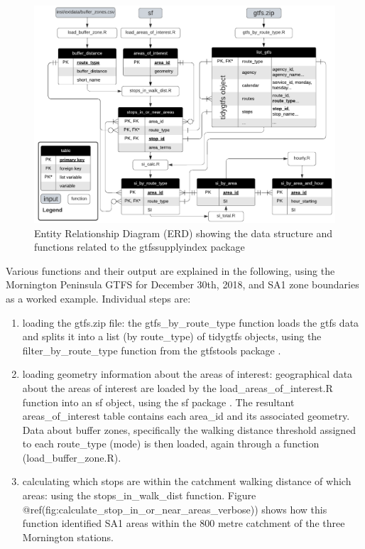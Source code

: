 \documentclass[preprint, 3p,
authoryear]{elsarticle} %
\begin{document}
\begin{figure}
\includegraphics[width=1\linewidth]{graphics/SI_data_structure} \caption{Entity Relationship Diagram (ERD) showing the data structure and functions related to the gtfssupplyindex package}\label{fig:SI_ERD}
\end{figure}

Various functions and their output are explained in the following, using
the Mornington Peninsula GTFS for December 30th, 2018, and SA1 zone
boundaries as a worked example. Individual steps are:

\begin{enumerate}
\def\labelenumi{(\arabic{enumi})}
\item
  loading the gtfs.zip file: the gtfs\_by\_route\_type function loads
  the gtfs data and splits it into a list (by route\_type) of tidygtfs
  objects, using the filter\_by\_route\_type function from the gtfstools
  package \citep{filter_GTFS_by_mode}.
\item
  loading geometry information about the areas of interest: geographical
  data about the areas of interest are loaded by the
  load\_areas\_of\_interest.R function into an sf object, using the sf
  package \citep{R-sf}. The resultant areas\_of\_interest table contains
  each area\_id and its associated geometry. Data about buffer zones,
  specifically the walking distance threshold assigned to each
  route\_type (mode) is then loaded, again through a function
  (load\_buffer\_zone.R).
\item
  calculating which stops are within the catchment walking distance of
  which areas: using the stops\_in\_walk\_dist function. Figure
  @ref(fig:calculate\_stop\_in\_or\_near\_areas\_verbose)) shows how
  this function identified SA1 areas within the 800 metre catchment of
  the three Mornington stations.
\end{enumerate}
\end{document}
